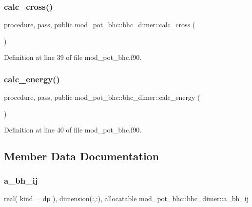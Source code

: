 \subsubsection{\texorpdfstring{calc\+\_\+cross()}{calc\_cross()}}
{\footnotesize\ttfamily procedure, pass, public mod\+\_\+pot\+\_\+bhc\+::bhc\+\_\+dimer\+::calc\+\_\+cross (\begin{DoxyParamCaption}{ }\end{DoxyParamCaption})}



Definition at line 39 of file mod\+\_\+pot\+\_\+bhc.\+f90.

\mbox{\label{structmod__pot__bhc_1_1bhc__dimer_a2e7a5592d05db91d843ba8b60000103e}} 
\subsubsection{\texorpdfstring{calc\+\_\+energy()}{calc\_energy()}}
{\footnotesize\ttfamily procedure, pass, public mod\+\_\+pot\+\_\+bhc\+::bhc\+\_\+dimer\+::calc\+\_\+energy (\begin{DoxyParamCaption}{ }\end{DoxyParamCaption})}



Definition at line 40 of file mod\+\_\+pot\+\_\+bhc.\+f90.



\subsection{Member Data Documentation}
\mbox{\label{structmod__pot__bhc_1_1bhc__dimer_ac3f6fbdddab95918810d81e0ecdd3ab0}} 
\subsubsection{\texorpdfstring{a\+\_\+bh\+\_\+ij}{a\_bh\_ij}}
{\footnotesize\ttfamily real( kind = dp ), dimension(\+:,\+:), allocatable mod\+\_\+pot\+\_\+bhc\+::bhc\+\_\+dimer\+::a\+\_\+bh\+\_\+ij}



